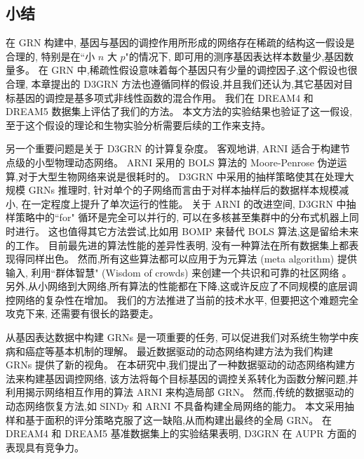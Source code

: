 \subsection{小结}

在 GRN 构建中, 基因与基因的调控作用所形成的网络存在稀疏的结构这一假设是合理的,
特别是在``小 $n$ 大 $p$"的情况下, 即可用的测序基因表达样本数量少,基因数量多。
在 GRN 中,稀疏性假设意味着每个基因只有少量的调控因子,这个假设也很合理,
本章提出的 D3GRN 方法也遵循同样的假设,并且我们还认为,其它基因对目标基因的调控是基多项式非线性函数的混合作用。
我们在 DREAM4 和 DREAM5 数据集上评估了我们的方法。
本文方法的实验结果也验证了这一假设,至于这个假设的理论和生物实验分析需要后续的工作来支持。

另一个重要问题是关于 D3GRN 的计算复杂度。
客观地讲, ARNI 适合于构建节点级的小型物理动态网络。
ARNI 采用的 BOLS 算法的 Moore-Penrose 伪逆运算,对于大型生物网络来说是很耗时的。
D3GRN 中采用的抽样策略使其在处理大规模 GRNs 推理时,
针对单个的子网络而言由于对样本抽样后的数据样本规模减小,
在一定程度上提升了单次运行的性能。
关于 ARNI 的改进空间, D3GRN 中抽样策略中的``for" 循环是完全可以并行的,
可以在多核甚至集群中的分布式机器上同时进行。
这也值得其它方法尝试,比如用 BOMP \cite{majumdar2009fast}来替代 BOLS 算法,这是留给未来的工作。
目前最先进的算法性能的差异性表明,
没有一种算法在所有数据集上都表现得同样出色。
然而,所有这些算法都可以应用于为元算法 (meta algorithm) 提供输入,
利用``群体智慧" (Wisdom of crowds) 来创建一个共识和可靠的社区网络 \cite{Marbach2012a,zheng2008gene}。
另外,从小网络到大网络,所有算法的性能都在下降,这或许反应了不同规模的底层调控网络的复杂性在增加。
我们的方法推进了当前的技术水平, 但要把这个难题完全攻克下来, 还需要有很长的路要走。

从基因表达数据中构建 GRNs 是一项重要的任务,
可以促进我们对系统生物学中疾病和癌症等基本机制的理解。
最近数据驱动的动态网络构建方法为我们构建 GRNs 提供了新的视角。
在本研究中,我们提出了一种数据驱动的动态网络构建方法来构建基因调控网络,
该方法将每个目标基因的调控关系转化为函数分解问题,并利用揭示网络相互作用的算法 ARNI 来构造局部 GRN。
然而,传统的数据驱动的动态网络恢复方法,如 SINDy 和 ARNI 不具备构建全局网络的能力。
本文采用抽样和基于面积的评分策略克服了这一缺陷,从而构建出最终的全局 GRN。
在 DREAM4 和 DREAM5 基准数据集上的实验结果表明, D3GRN 在 AUPR 方面的表现具有竞争力。